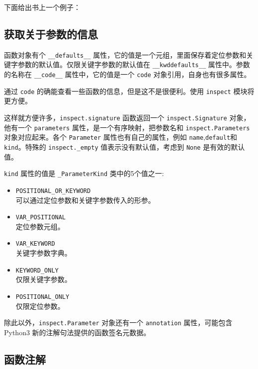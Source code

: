 下面给出书上一个例子：



\subsection{获取关于参数的信息}

函数对象有个 \texttt{\_\_defaults\_\_} 属性，它的值是一个元组，里面保存着定位参数和关键字参数的默认值。仅限关键字参数的默认值在 \texttt{\_\_kwddefaults\_\_} 属性中。参数的名称在 \texttt{\_\_code\_\_} 属性中，它的值是一个 \texttt{code} 对象引用，自身也有很多属性。



通过 \texttt{code} 的确能查看一些函数的信息，但是这不是很便利。使用 \texttt{inspect} 模块将更方便。 



这样就方便许多，\texttt{inspect.signature} 函数返回一个 \texttt{inspect.Signature} 对象，他有一个 \texttt{parameters} 属性，是一个有序映射，把参数名和 \texttt{inspect.Parameters} 对象对应起来。各个 \texttt{Parameter} 属性也有自己的属性，例如 \texttt{name},\texttt{default}和 \texttt{kind}。特殊的 \texttt{inspect.\_empty} 值表示没有默认值，考虑到 \texttt{None} 是有效的默认值。

\texttt{kind} 属性的值是 \texttt{\_ParameterKind} 类中的5个值之一:
\begin{itemize}
    \item \texttt{POSITIONAL\_OR\_KEYWORD} \\
    可以通过定位参数和关键字参数传入的形参。
    \item \texttt{VAR\_POSITIONAL} \\
    定位参数元组。
    \item \texttt{VAR\_KEYWORD} \\
    关键字参数字典。 
    \item \texttt{KEYWORD\_ONLY} \\
    仅限关键字参数。
    \item \texttt{POSITIONAL\_ONLY} \\
    仅限定位参数。
\end{itemize}

除此以外，\texttt{inspect.Parameter} 对象还有一个 \texttt{annotation} 属性，可能包含 Python3 新的注解句法提供的函数签名元数据。

\subsection{函数注解}


